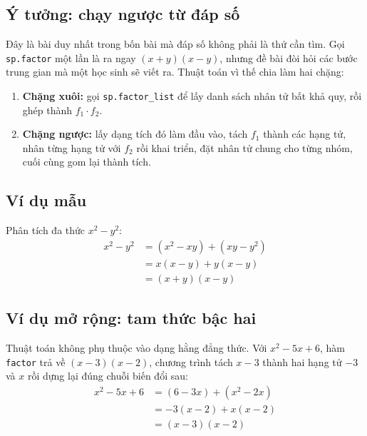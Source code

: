 \documentclass[12pt,a4paper]{article}
\begin{document}
\subsection{Ý tưởng: chạy ngược từ đáp số}

Đây là bài duy nhất trong bốn bài mà đáp số không phải là thứ cần tìm. Gọi \texttt{sp.factor} một lần là ra ngay $(x+y)(x-y)$, nhưng đề bài đòi hỏi các bước trung gian mà một học sinh sẽ viết ra. Thuật toán vì thế chia làm hai chặng:
\begin{enumerate}
    \item \textbf{Chặng xuôi:} gọi \texttt{sp.factor\_list} để lấy danh sách nhân tử bất khả quy, rồi ghép thành $f_1 \cdot f_2$.
    \item \textbf{Chặng ngược:} lấy dạng tích đó làm đầu vào, tách $f_1$ thành các hạng tử, nhân từng hạng tử với $f_2$ rồi khai triển, đặt nhân tử chung cho từng nhóm, cuối cùng gom lại thành tích.
\end{enumerate}

\subsection{Ví dụ mẫu}
Phân tích đa thức $x^2 - y^2$:
\begin{align*}
    x^2 - y^2 &= (x^2 - xy) + (xy - y^2) \\
              &= x(x - y) + y(x - y) \\
              &= (x + y)(x - y)
\end{align*}

\subsection{Ví dụ mở rộng: tam thức bậc hai}
Thuật toán không phụ thuộc vào dạng hằng đẳng thức. Với $x^2 - 5x + 6$, hàm \texttt{factor} trả về $(x-3)(x-2)$, chương trình tách $x - 3$ thành hai hạng tử $-3$ và $x$ rồi dựng lại đúng chuỗi biến đổi sau:
\begin{align*}
    x^2 - 5x + 6 &= (6 - 3x) + (x^2 - 2x) \\
                 &= -3(x - 2) + x(x - 2) \\
                 &= (x - 3)(x - 2)
\end{align*}
\end{document}
